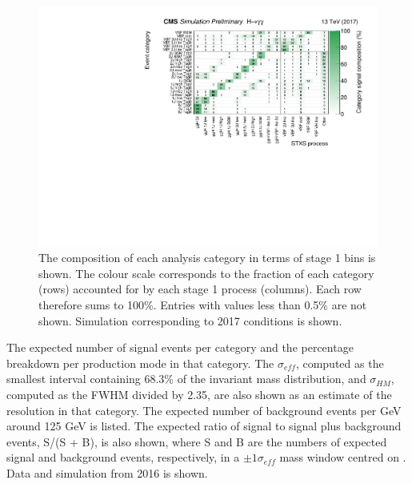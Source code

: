 \begin{figure}[hptb]
\centering
\includegraphics[width=\textwidth]{Figures/Results/Cats2017.pdf}
\caption{
  The composition of each analysis category in terms of stage 1 bins is shown. 
  The colour scale corresponds to the fraction of each category (rows) 
  accounted for by each stage 1 process (columns). 
  Each row therefore sums to 100\%. 
  Entries with values less than 0.5\% are not shown. 
  Simulation corresponding to 2017 conditions is shown.
}
\label{fig:results_Cats2017}
\end{figure}

\begin{landscape}
  \begin{table}
    \resizebox{1.5\textwidth}{!}{}
    \caption{
      The expected number of signal events per category and
      the percentage breakdown per production mode in that category. 
      The $\sigma_{eff}$, computed as the smallest interval containing 68.3\% 
      of the invariant mass distribution, and $\sigma_{HM}$, computed as the FWHM divided by 2.35,
      are also shown as an estimate of the \mgg resolution in that category.
      The expected number of background events per GeV around 125 GeV is listed.
      The expected ratio of signal to signal plus background events, S/(S + B), is also shown,
      where S and B are the numbers of expected signal and background events, respectively, 
      in a $\pm 1 \sigma_{eff}$ mass window centred on \mH.
      Data and simulation from 2016 is shown.}
    \label{tab:results_yields2016}
  \end{table}
\end{landscape}

